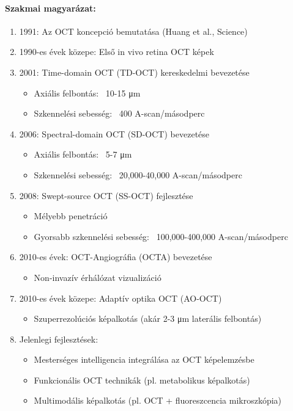 \documentclass[a4paper,12pt]{article}
\begin{document}
\paragraph{Szakmai magyarázat:} \begin{enumerate} \item 1991: Az OCT koncepció bemutatása (Huang et al., Science)

\item 1990-es évek közepe: Első in vivo retina OCT képek \item 2001: Time-domain OCT (TD-OCT) kereskedelmi bevezetése \begin{itemize} \item Axiális felbontás: ~10-15 μm \item Szkennelési sebesség: ~400 A-scan/másodperc \end{itemize} \item 2006: Spectral-domain OCT (SD-OCT) bevezetése \begin{itemize} \item Axiális felbontás: ~5-7 μm \item Szkennelési sebesség: ~20,000-40,000 A-scan/másodperc \end{itemize} \item 2008: Swept-source OCT (SS-OCT) fejlesztése \begin{itemize} \item Mélyebb penetráció \item Gyorsabb szkennelési sebesség: ~100,000-400,000 A-scan/másodperc \end{itemize} \item 2010-es évek: OCT-Angiográfia (OCTA) bevezetése \begin{itemize} \item Non-invazív érhálózat vizualizáció \end{itemize} \item 2010-es évek közepe: Adaptív optika OCT (AO-OCT) \begin{itemize} \item Szuperrezolúciós képalkotás (akár 2-3 μm laterális felbontás) \end{itemize} \item Jelenlegi fejlesztések: \begin{itemize} \item Mesterséges intelligencia integrálása az OCT képelemzésbe \item Funkcionális OCT technikák (pl. metabolikus képalkotás) \item Multimodális képalkotás (pl. OCT + fluoreszcencia mikroszkópia) \end{itemize}
\end{enumerate}
\end{document}
